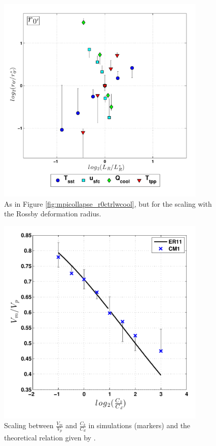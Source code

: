 \documentclass[12pt]{article}
\begin{document}
\begin{figure}[h!]
\centering
  \noindent\includegraphics[width=10cm,height=10cm]{FIGURES_TC_RCE_equilibrium_v2.0/Fig5half_LR_nocollapse_r0ctrlwcool.pdf}
\caption{As in Figure \ref{fig:mpicollapse_r0ctrlwcool}, but for the scaling with the Rossby deformation radius.}
\label{fig:LRnocollapse_r0ctrlwcool}
\end{figure}

\begin{figure}[h!]
\centering
  \noindent\includegraphics[width=10cm,height=10cm]{FIGURES_TC_RCE_equilibrium_v2.0/Fig9_CkCd_scaling_VmVp.pdf}
\caption{Scaling between $\frac{V_m}{V_p}$ and $\frac{C_k}{C_d}$ in simulations (markers) and the theoretical relation given by \cite{Emanuel_Rotunno_2011}.}
\label{fig:VmVp_CkCd}
\end{figure}
\end{document}
